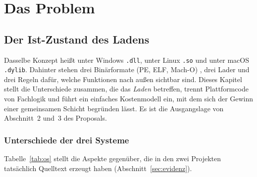 \documentclass[a4paper,12pt,twoside]{report}
\DeclareRobustCommand{\_}{\ifmmode\mbox{\textunderscore}\else\textunderscore\allowbreak{}\fi}
\theoremstyle{definition}
\begin{document}
\part{Das Problem}

\chapter{Der Ist-Zustand des Ladens}
\label{chap:istzustand}

Dasselbe Konzept heißt unter Windows \texttt{.dll}, unter Linux \texttt{.so} und unter macOS \texttt{.dylib}. Dahinter stehen drei Binärformate (PE, ELF, Mach-O) \cite{levine2000,drepper2011}, drei Lader und drei Regeln dafür, welche Funktionen nach außen sichtbar sind. Dieses Kapitel stellt die Unterschiede zusammen, die das \emph{Laden} betreffen, trennt Plattformcode von Fachlogik und führt ein einfaches Kostenmodell ein, mit dem sich der Gewinn einer gemeinsamen Schicht begründen lässt. Es ist die Ausgangslage von Abschnitt~2 und~3 des Proposals.

\section{Unterschiede der drei Systeme}

Tabelle~\ref{tab:os} stellt die Aspekte gegenüber, die in den zwei Projekten tatsächlich Quelltext erzeugt haben (Abschnitt~\ref{sec:evidenz}).
\end{document}
